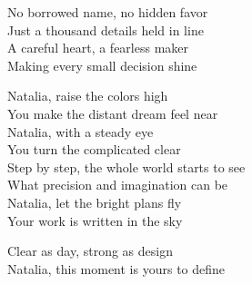 \begin{lyrics}
No borrowed name, no hidden favor\\
Just a thousand details held in line\\
A careful heart, a fearless maker\\
Making every small decision shine

Natalia, raise the colors high\\
You make the distant dream feel near\\
Natalia, with a steady eye\\
You turn the complicated clear\\
Step by step, the whole world starts to see\\
What precision and imagination can be\\
Natalia, let the bright plans fly\\
Your work is written in the sky

Clear as day, strong as design\\
Natalia, this moment is yours to define
\end{lyrics}

